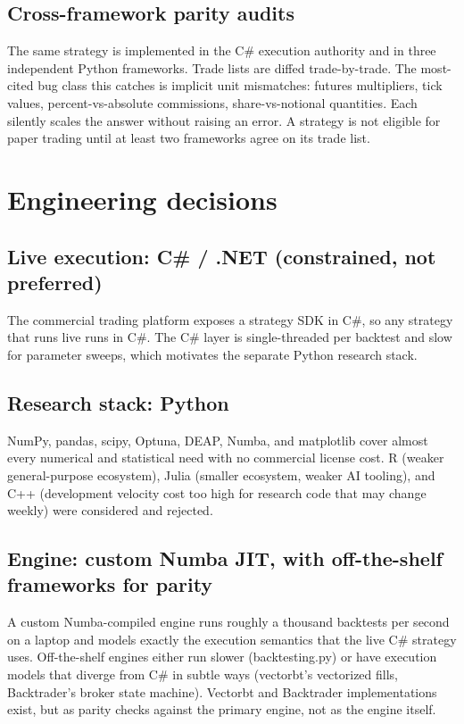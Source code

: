 \documentclass[10pt,letterpaper]{article}
\begin{document}
\subsection{Cross-framework parity audits}

The same strategy is implemented in the C\# execution authority and in three independent Python frameworks. Trade lists are diffed trade-by-trade. The most-cited bug class this catches is implicit unit mismatches: futures multipliers, tick values, percent-vs-absolute commissions, share-vs-notional quantities. Each silently scales the answer without raising an error. A strategy is not eligible for paper trading until at least two frameworks agree on its trade list.

\newpage

\section{Engineering decisions}

\subsection{Live execution: C\# / .NET (constrained, not preferred)}

The commercial trading platform exposes a strategy SDK in C\#, so any strategy that runs live runs in C\#. The C\# layer is single-threaded per backtest and slow for parameter sweeps, which motivates the separate Python research stack.

\subsection{Research stack: Python}

NumPy, pandas, scipy, Optuna, DEAP, Numba, and matplotlib cover almost every numerical and statistical need with no commercial license cost. R (weaker general-purpose ecosystem), Julia (smaller ecosystem, weaker AI tooling), and C++ (development velocity cost too high for research code that may change weekly) were considered and rejected.

\subsection{Engine: custom Numba JIT, with off-the-shelf frameworks for parity}

A custom Numba-compiled engine runs roughly a thousand backtests per second on a laptop and models exactly the execution semantics that the live C\# strategy uses. Off-the-shelf engines either run slower (backtesting.py) or have execution models that diverge from C\# in subtle ways (vectorbt's vectorized fills, Backtrader's broker state machine). Vectorbt and Backtrader implementations exist, but as parity checks against the primary engine, not as the engine itself.
\end{document}
